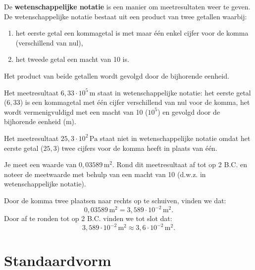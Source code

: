 \documentclass{ximera}
\begin{document}
\begin{definition}\nl
    De \textbf{wetenschappelijke notatie} is een manier om meetresultaten weer te geven. De wetenschappelijke notatie bestaat uit een product van twee getallen waarbij:
    \begin{enumerate}
    \item het eerste getal een kommagetal is met maar één enkel cijfer voor de komma (verschillend van nul),
    \item het tweede getal een macht van 10 is.
    \end{enumerate}
    Het product van beide getallen wordt gevolgd door de bijhorende eenheid.
\end{definition}

\begin{example}[title={Wetenschappelijke notatie}]\nl
    Het meetresultaat $6{,}33 \cdot 10^{5} \, \mathrm{m}$ staat in wetenschappelijke notatie: het eerste getal ($6{,}33$) is een kommagetal met één cijfer verschillend van nul voor de komma, het wordt vermenigvuldigd met een macht van 10 ($10^{5}$) en gevolgd door de bijhorende eenheid ($\mathrm{m}$).
\end{example}

\begin{example}[title={Niet-wetenschappelijke notatie}]\nl
    Het meetresultaat $25{,}3 \cdot 10^{2} \, \mathrm{Pa}$ staat niet in wetenschappelijke notatie omdat het eerste getal ($25{,}3$) twee cijfers voor de komma heeft in plaats van één.
\end{example}

\begin{example}[foldable=true,title={Voorbeeld: groot getal afronden op aantal B.C.}]\nl
    Je meet een waarde van $0{,}03589 \, \mathrm{m}^{2}$. Rond dit meetresultaat af tot op 2 B.C. en noteer de meetwaarde met behulp van een macht van 10 (d.w.z. in wetenschappelijke notatie). 

    \begin{solution}\nl
    Door de komma twee plaatsen naar rechts op te schuiven, vinden we dat:
    \[0{,}03589 \, \mathrm{m}^{2} = 3{,}589 \cdot 10^{-2} \, \mathrm{m}^{2}.\] 
    Door af te ronden tot op 2 B.C. vinden we tot slot dat:
    \[3{,}589 \cdot 10^{-2} \, \mathrm{m}^{2} \approx 3{,}6 \cdot 10^{-2} \, \mathrm{m}^{2}.\]
    \end{solution}
\end{example}

\section{Standaardvorm}
\end{document}
